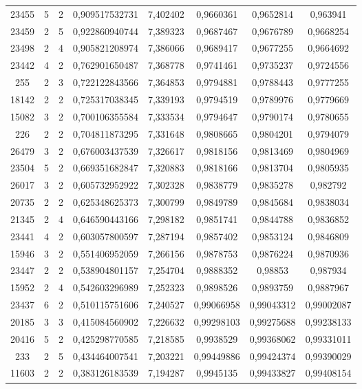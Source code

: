 \begin{longtable}{|c|c|c|c|c|c|c|c|}
23455 & 5 & 2 & 0,909517532731 & 7,402402 & 0,9660361 & 0,9652814 & 0,963941 \\
23459 & 2 & 5 & 0,922860940744 & 7,389323 & 0,9687467 & 0,9676789 & 0,9668254 \\
23498 & 2 & 4 & 0,905821208974 & 7,386066 & 0,9689417 & 0,9677255 & 0,9664692 \\
23442 & 4 & 2 & 0,762901650487 & 7,368778 & 0,9741461 & 0,9735237 & 0,9724556 \\
255 & 2 & 3 & 0,722122843566 & 7,364853 & 0,9794881 & 0,9788443 & 0,9777255 \\
18142 & 2 & 2 & 0,725317038345 & 7,339193 & 0,9794519 & 0,9789976 & 0,9779669 \\
15082 & 3 & 2 & 0,700106355584 & 7,333534 & 0,9794647 & 0,9790174 & 0,9780655 \\
226 & 2 & 2 & 0,704811873295 & 7,331648 & 0,9808665 & 0,9804201 & 0,9794079 \\
26479 & 3 & 2 & 0,676003437539 & 7,326617 & 0,9818156 & 0,9813469 & 0,9804969 \\
23504 & 5 & 2 & 0,669351682847 & 7,320883 & 0,9818166 & 0,9813704 & 0,9805935 \\
26017 & 3 & 2 & 0,605732952922 & 7,302328 & 0,9838779 & 0,9835278 & 0,982792 \\
20735 & 2 & 2 & 0,625348625373 & 7,300799 & 0,9849789 & 0,9845684 & 0,9838034 \\
21345 & 2 & 4 & 0,646590443166 & 7,298182 & 0,9851741 & 0,9844788 & 0,9836852 \\
23441 & 4 & 2 & 0,603057800597 & 7,287194 & 0,9857402 & 0,9853124 & 0,9846809 \\
15946 & 3 & 2 & 0,551406952059 & 7,266156 & 0,9878753 & 0,9876224 & 0,9870936 \\
23447 & 2 & 2 & 0,538904801157 & 7,254704 & 0,9888352 & 0,98853 & 0,987934 \\
15952 & 2 & 4 & 0,542603296989 & 7,252323 & 0,9898526 & 0,9893759 & 0,9887967 \\
23437 & 6 & 2 & 0,510115751606 & 7,240527 & 0,99066958 & 0,99043312 & 0,99002087 \\
20185 & 3 & 3 & 0,415084560902 & 7,226632 & 0,99298103 & 0,99275688 & 0,99238133 \\
20416 & 5 & 2 & 0,425298770585 & 7,218585 & 0,9938529 & 0,99368062 & 0,99331011 \\
233 & 2 & 5 & 0,434464007541 & 7,203221 & 0,99449886 & 0,99424374 & 0,99390029 \\
11603 & 2 & 2 & 0,383126183539 & 7,194287 & 0,9945135 & 0,99433827 & 0,99408154 \\

\end{longtable}
